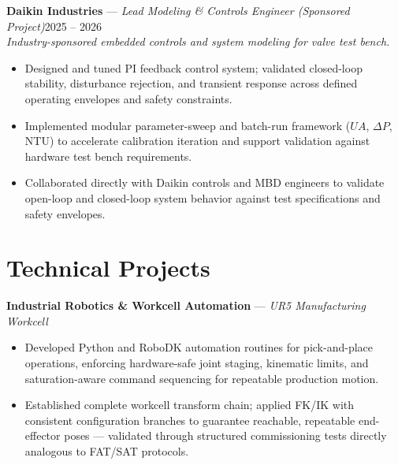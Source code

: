\documentclass[10pt, letterpaper]{article}
\begin{document}
\textbf{Daikin Industries} —\textit{ Lead Modeling \& Controls Engineer (Sponsored Project)}\hfill 2025 -- 2026\\[-2pt]
\vspace{0.1mm}
\textit{Industry-sponsored embedded controls and system modeling for valve test bench.}
\begin{itemize}[leftmargin=1.5em, itemsep=2pt, topsep=2pt]
    \item Designed and tuned PI feedback control system; validated closed-loop stability, disturbance rejection, and transient response across defined operating envelopes and safety constraints.
    \item Implemented modular parameter-sweep and batch-run framework ($UA$, $\Delta P$, NTU) to accelerate calibration iteration and support validation against hardware test bench requirements.
    \item Collaborated directly with Daikin controls and MBD engineers to validate open-loop and closed-loop system behavior against test specifications and safety envelopes.
\end{itemize}
\vspace{+0.5mm}


\section{Technical Projects}
\textbf{Industrial Robotics \& Workcell Automation} — \textit{UR5 Manufacturing Workcell} \\[-2pt]
\vspace{0.1mm}
\begin{itemize}[leftmargin=1.5em,itemsep=2pt,topsep=2pt]
    \item Developed Python and RoboDK automation routines for pick-and-place operations, enforcing hardware-safe joint staging, kinematic limits, and saturation-aware command sequencing for repeatable production motion.
    \item Established complete workcell transform chain; applied FK/IK with consistent configuration branches to guarantee reachable, repeatable end-effector poses --- validated through structured commissioning tests directly analogous to FAT/SAT protocols.
\end{itemize}
\vspace{+0.5mm}
\end{document}
